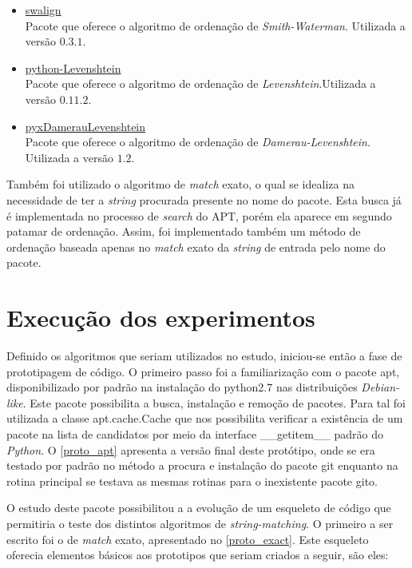 \begin{itemize}
	\item \href{https://pypi.python.org/pypi/swalign/}{swalign}\\
	Pacote que oferece o algoritmo de ordenação de \textit{Smith-Waterman}. Utilizada a versão $0.3.1$.
	\item \href{https://pypi.python.org/pypi/python-Levenshtein/}{python-Levenshtein}\\
	Pacote que oferece o algoritmo de ordenação de \textit{Levenshtein}.Utilizada a versão $0.11.2$.
	\item \href{https://pypi.python.org/pypi/pyxDamerauLevenshtein/}{pyxDamerauLevenshtein}\\
	Pacote que oferece o algoritmo de ordenação de \textit{Damerau-Levenshtein}. Utilizada a versão $1.2$.
\end{itemize}

Também foi utilizado o algoritmo de \textit{match} exato, o qual se idealiza na necessidade de ter a \textit{string} procurada presente no nome do pacote. Esta busca já é implementada no processo de \textit{search} do APT, porém ela aparece em segundo patamar de ordenação. Assim, foi implementado também um método de ordenação baseada apenas no \textit{match} exato  da \textit{string} de entrada pelo nome do pacote.


\section{Execução dos experimentos}

Definido os algoritmos que seriam utilizados no estudo, iniciou-se então a fase de prototipagem de código. O primeiro passo foi a familiarização com o pacote {\code apt}, disponibilizado por padrão na instalação do {\code python2.7} nas distribuições \textit{Debian-like}. Este pacote possibilita a busca, instalação e remoção de pacotes. Para tal foi utilizada a classe {\code apt.cache.Cache} que nos possibilita verificar a existência de um pacote na lista de candidatos por meio da interface {\code \_\_getitem\_\_} padrão do \textit{Python}. O \autoref{proto_apt} apresenta a versão final deste protótipo, onde se era testado por padrão no método a procura e instalação do pacote {\code git} enquanto na rotina principal se testava as mesmas rotinas para o inexistente pacote {\code gito}.



O estudo deste pacote possibilitou a a evolução de um esqueleto de código que permitiria o teste dos distintos algoritmos de \textit{string-matching}. O primeiro a ser escrito foi o de \textit{match} exato, apresentado no \autoref{proto_exact}. Este esqueleto oferecia elementos básicos aos prototipos que seriam criados a seguir, são eles:

